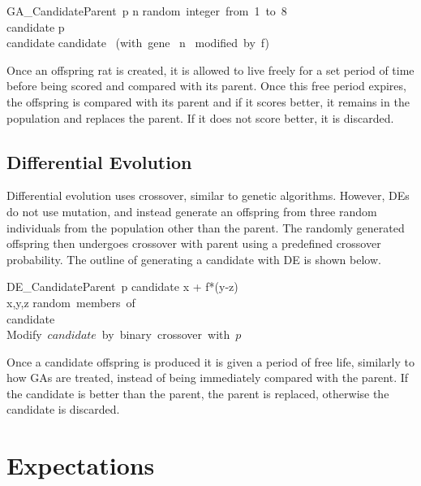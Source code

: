 \documentclass{sig-alternate}
\begin{document}
\begin{pseudocode}{GA\_Candidate}{\mbox{Parent p}}
n \GETS \mbox{random integer from 1 to 8}\\
candidate \GETS p\\
candidate \GETS candidate \mbox{ (with gene } n \mbox{ modified by f)}\\
\end{pseudocode}

Once an offspring rat is created, it is allowed to live freely for a set period of time before being scored and compared with its parent.  Once this free period expires, the offspring is compared with its parent and if it scores better, it remains in the population and replaces the parent.  If it does not score better, it is discarded.

\subsection{Differential Evolution}
Differential evolution uses crossover, similar to genetic algorithms.  However, DEs do not use mutation, and instead generate an offspring from three random individuals from the population other than the parent.  The randomly generated offspring then undergoes crossover with parent using a predefined crossover probability.  The outline of generating a candidate with DE is shown below.\cite{DEMO}

\begin{pseudocode}{DE\_Candidate}{\mbox{Parent p}}
candidate \GETS x + f*(y-z)\\
\ENDPROCEDURE
\MAIN
x,y,z \GETS \mbox{random members of }\\
candidate \GETS {}\\
\mbox{Modify $candidate$ by binary crossover with $p$}\\
\ENDMAIN
\end{pseudocode}

Once a candidate offspring is produced it is given a period of free life, similarly to how GAs are treated, instead of being immediately compared with the parent.  If the candidate is better than the parent, the parent is replaced, otherwise the candidate is discarded.

\section{Expectations}
\end{document}
